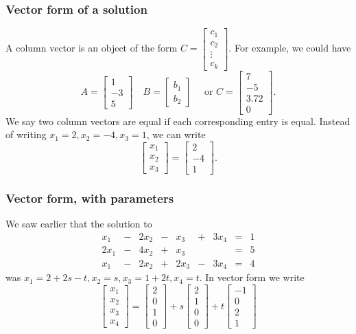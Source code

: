 \documentclass[12pt,t]{beamer}
\begin{document}
\begin{frame}\frametitle{Vector form of a solution}
 A \alert{column vector} is an object of the form $C = \begin{bmatrix}c_1\\c_2\\ \vdots \\ c_k\end{bmatrix}$. For example, we could have
\[
 A = \begin{bmatrix}1\\-3\\5\end{bmatrix}\quad B = \begin{bmatrix}b_1\\b_2\end{bmatrix} \quad \text{ or } C=\begin{bmatrix} 7\\ -5\\ 3.72\\0\end{bmatrix}.
\]
We say two column vectors are \alert{equal} if each corresponding entry is equal. Instead of writing $x_1 = 2, x_2 = -4, x_3 = 1$, we can write
\[
 \begin{bmatrix}x_1\\x_2\\x_3\end{bmatrix} = \begin{bmatrix}2\\-4\\1\end{bmatrix}.
\]

\end{frame}
\begin{frame}\frametitle{Vector form, with parameters}
 We saw earlier that the solution to
\[
 \begin{array}{rrrrrrrrr}
 x_1 &-& 2x_2 &-& x_3 &+& 3x_4 &=& 1\\
 2x_1&-& 4x_2 &+& x_3 & & &=& 5\\
 x_1 &-& 2x_2 &+& 2x_3 &-& 3x_4 &=& 4
\end{array}
\]
was $x_1 = 2+2s-t, x_2=s, x_3 = 1+2t, x_4 = t$. In vector form we write
\[
 \begin{bmatrix}x_1\\x_2\\x_3\\x_4\end{bmatrix} = \begin{bmatrix}2\\0\\1\\0\end{bmatrix}+s\begin{bmatrix}2\\1\\0\\0\end{bmatrix}+t\begin{bmatrix}-1\\0\\2\\1\end{bmatrix}
\]

\end{frame}
\end{document}
